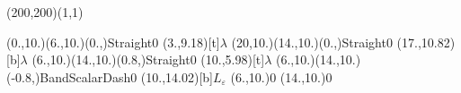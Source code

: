 \unitlength=1bp%

\begin{feynartspicture}(200,200)(1,1)

\FADiagram{}
\FAProp(0.,10.)(6.,10.)(0.,){Straight}{0}
\FALabel(3.,9.18)[t]{$\lambda$}
\FAProp(20,10.)(14.,10.)(0.,){Straight}{0}
\FALabel(17.,10.82)[b]{$\lambda$}
\FAProp(6.,10.)(14.,10.)(0.8,){Straight}{0}
\FALabel(10.,5.98)[t]{$\lambda$}
\FAProp(6.,10.)(14.,10.)(-0.8,){BandScalarDash}{0}
\FALabel(10.,14.02)[b]{$L_\varepsilon$}
\FAVert(6.,10.){0}
\FAVert(14.,10.){0}
\end{feynartspicture}

